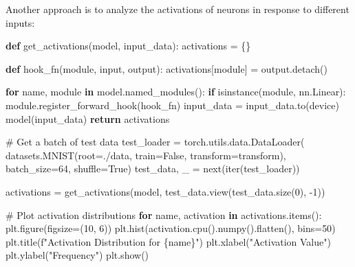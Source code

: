 \documentclass[
  letterpaper,
  DIV=11,
  numbers=noendperiod]{scrreprt}
\newenvironment{Shaded}{\begin{snugshade}}{\end{snugshade}}
\newcommand{\BuiltInTok}[1]{\textcolor[rgb]{0.00,0.23,0.31}{#1}}
\newcommand{\CommentTok}[1]{\textcolor[rgb]{0.37,0.37,0.37}{#1}}
\newcommand{\ControlFlowTok}[1]{\textcolor[rgb]{0.00,0.23,0.31}{\textbf{#1}}}
\newcommand{\DecValTok}[1]{\textcolor[rgb]{0.68,0.00,0.00}{#1}}
\newcommand{\KeywordTok}[1]{\textcolor[rgb]{0.00,0.23,0.31}{\textbf{#1}}}
\newcommand{\NormalTok}[1]{\textcolor[rgb]{0.00,0.23,0.31}{#1}}
\newcommand{\OperatorTok}[1]{\textcolor[rgb]{0.37,0.37,0.37}{#1}}
\newcommand{\SpecialCharTok}[1]{\textcolor[rgb]{0.37,0.37,0.37}{#1}}
\newcommand{\SpecialStringTok}[1]{\textcolor[rgb]{0.13,0.47,0.30}{#1}}
\newcommand{\StringTok}[1]{\textcolor[rgb]{0.13,0.47,0.30}{#1}}
\newcommand{\VariableTok}[1]{\textcolor[rgb]{0.07,0.07,0.07}{#1}}
\begin{document}
Another approach is to analyze the activations of neurons in response to
different inputs:

\begin{Shaded}
\begin{Highlighting}[]
\KeywordTok{def}\NormalTok{ get\_activations(model, input\_data):}
\NormalTok{    activations }\OperatorTok{=}\NormalTok{ \{\}}

    \KeywordTok{def}\NormalTok{ hook\_fn(module, }\BuiltInTok{input}\NormalTok{, output):}
\NormalTok{        activations[module] }\OperatorTok{=}\NormalTok{ output.detach()}

    \ControlFlowTok{for}\NormalTok{ name, module }\KeywordTok{in}\NormalTok{ model.named\_modules():}
        \ControlFlowTok{if} \BuiltInTok{isinstance}\NormalTok{(module, nn.Linear):}
\NormalTok{            module.register\_forward\_hook(hook\_fn)}
\NormalTok{    input\_data }\OperatorTok{=}\NormalTok{ input\_data.to(device)}
\NormalTok{    model(input\_data)}
    \ControlFlowTok{return}\NormalTok{ activations}

\CommentTok{\# Get a batch of test data}
\NormalTok{test\_loader }\OperatorTok{=}\NormalTok{ torch.utils.data.DataLoader(}
\NormalTok{    datasets.MNIST(root}\OperatorTok{=}\StringTok{\textquotesingle{}./data\textquotesingle{}}\NormalTok{, train}\OperatorTok{=}\VariableTok{False}\NormalTok{, transform}\OperatorTok{=}\NormalTok{transform),}
\NormalTok{    batch\_size}\OperatorTok{=}\DecValTok{64}\NormalTok{, shuffle}\OperatorTok{=}\VariableTok{True}\NormalTok{)}
\NormalTok{test\_data, \_ }\OperatorTok{=} \BuiltInTok{next}\NormalTok{(}\BuiltInTok{iter}\NormalTok{(test\_loader))}

\NormalTok{activations }\OperatorTok{=}\NormalTok{ get\_activations(model, test\_data.view(test\_data.size(}\DecValTok{0}\NormalTok{), }\OperatorTok{{-}}\DecValTok{1}\NormalTok{))}

\CommentTok{\# Plot activation distributions}
\ControlFlowTok{for}\NormalTok{ name, activation }\KeywordTok{in}\NormalTok{ activations.items():}
\NormalTok{    plt.figure(figsize}\OperatorTok{=}\NormalTok{(}\DecValTok{10}\NormalTok{, }\DecValTok{6}\NormalTok{))}
\NormalTok{    plt.hist(activation.cpu().numpy().flatten(), bins}\OperatorTok{=}\DecValTok{50}\NormalTok{)}
\NormalTok{    plt.title(}\SpecialStringTok{f"Activation Distribution for }\SpecialCharTok{\{}\NormalTok{name}\SpecialCharTok{\}}\SpecialStringTok{"}\NormalTok{)}
\NormalTok{    plt.xlabel(}\StringTok{"Activation Value"}\NormalTok{)}
\NormalTok{    plt.ylabel(}\StringTok{"Frequency"}\NormalTok{)}
\NormalTok{    plt.show()}
\end{Highlighting}
\end{Shaded}
\end{document}
